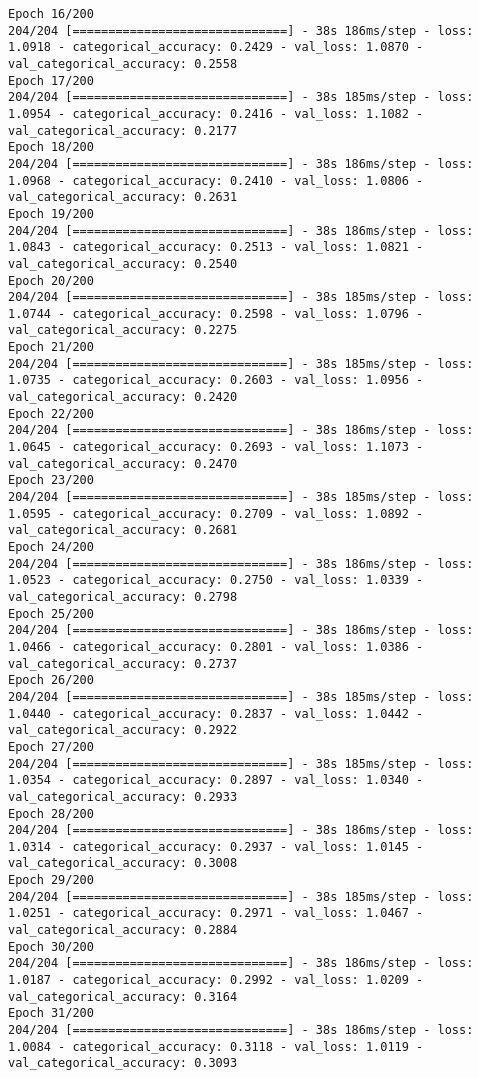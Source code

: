 \begin{lstlisting}
Epoch 16/200
204/204 [==============================] - 38s 186ms/step - loss: 1.0918 - categorical_accuracy: 0.2429 - val_loss: 1.0870 - val_categorical_accuracy: 0.2558
Epoch 17/200
204/204 [==============================] - 38s 185ms/step - loss: 1.0954 - categorical_accuracy: 0.2416 - val_loss: 1.1082 - val_categorical_accuracy: 0.2177
Epoch 18/200
204/204 [==============================] - 38s 186ms/step - loss: 1.0968 - categorical_accuracy: 0.2410 - val_loss: 1.0806 - val_categorical_accuracy: 0.2631
Epoch 19/200
204/204 [==============================] - 38s 186ms/step - loss: 1.0843 - categorical_accuracy: 0.2513 - val_loss: 1.0821 - val_categorical_accuracy: 0.2540
Epoch 20/200
204/204 [==============================] - 38s 185ms/step - loss: 1.0744 - categorical_accuracy: 0.2598 - val_loss: 1.0796 - val_categorical_accuracy: 0.2275
Epoch 21/200
204/204 [==============================] - 38s 185ms/step - loss: 1.0735 - categorical_accuracy: 0.2603 - val_loss: 1.0956 - val_categorical_accuracy: 0.2420
Epoch 22/200
204/204 [==============================] - 38s 186ms/step - loss: 1.0645 - categorical_accuracy: 0.2693 - val_loss: 1.1073 - val_categorical_accuracy: 0.2470
Epoch 23/200
204/204 [==============================] - 38s 185ms/step - loss: 1.0595 - categorical_accuracy: 0.2709 - val_loss: 1.0892 - val_categorical_accuracy: 0.2681
Epoch 24/200
204/204 [==============================] - 38s 186ms/step - loss: 1.0523 - categorical_accuracy: 0.2750 - val_loss: 1.0339 - val_categorical_accuracy: 0.2798
Epoch 25/200
204/204 [==============================] - 38s 186ms/step - loss: 1.0466 - categorical_accuracy: 0.2801 - val_loss: 1.0386 - val_categorical_accuracy: 0.2737
Epoch 26/200
204/204 [==============================] - 38s 185ms/step - loss: 1.0440 - categorical_accuracy: 0.2837 - val_loss: 1.0442 - val_categorical_accuracy: 0.2922
Epoch 27/200
204/204 [==============================] - 38s 185ms/step - loss: 1.0354 - categorical_accuracy: 0.2897 - val_loss: 1.0340 - val_categorical_accuracy: 0.2933
Epoch 28/200
204/204 [==============================] - 38s 186ms/step - loss: 1.0314 - categorical_accuracy: 0.2937 - val_loss: 1.0145 - val_categorical_accuracy: 0.3008
Epoch 29/200
204/204 [==============================] - 38s 185ms/step - loss: 1.0251 - categorical_accuracy: 0.2971 - val_loss: 1.0467 - val_categorical_accuracy: 0.2884
Epoch 30/200
204/204 [==============================] - 38s 186ms/step - loss: 1.0187 - categorical_accuracy: 0.2992 - val_loss: 1.0209 - val_categorical_accuracy: 0.3164
Epoch 31/200
204/204 [==============================] - 38s 186ms/step - loss: 1.0084 - categorical_accuracy: 0.3118 - val_loss: 1.0119 - val_categorical_accuracy: 0.3093

\end{lstlisting}
